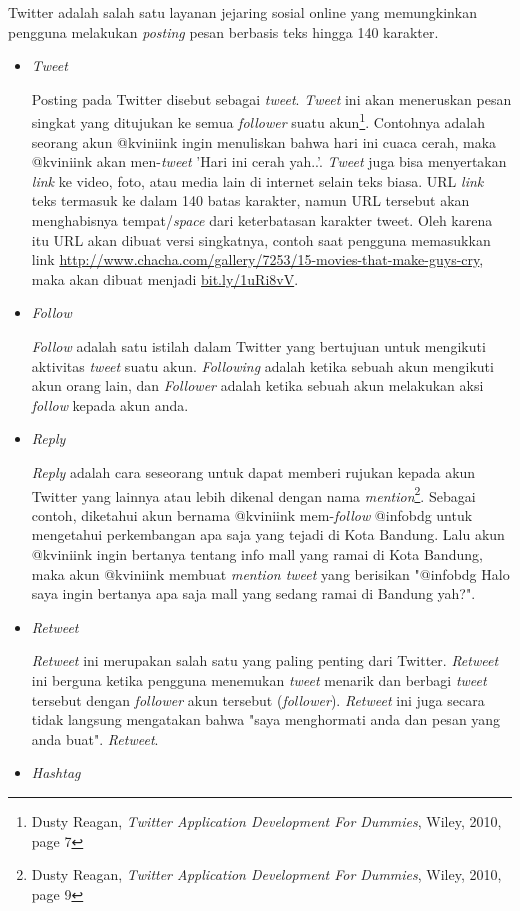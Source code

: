 Twitter adalah salah satu layanan jejaring sosial online yang memungkinkan pengguna melakukan \textit{posting} pesan berbasis teks hingga 140 karakter\cite{TwitterBook}.
\begin{itemize}
	\item \textit{Tweet} 
	
	Posting pada Twitter disebut sebagai \textit{tweet}. \textit{Tweet} ini akan meneruskan pesan singkat yang ditujukan ke semua \textit{follower} suatu akun\footnote{Dusty Reagan, \textit{Twitter Application Development For Dummies}, Wiley, 2010, page 7}. Contohnya adalah seorang akun @kviniink ingin menuliskan bahwa hari ini cuaca cerah, maka @kviniink akan men-\textit{tweet} 'Hari ini cerah yah..'. \textit{Tweet} juga bisa menyertakan \textit{link} ke video, foto, atau media lain di internet selain teks biasa. URL \textit{link} teks termasuk ke dalam 140 batas karakter, namun URL tersebut akan menghabisnya tempat/\textit{space} dari keterbatasan karakter tweet. Oleh karena itu URL akan dibuat versi singkatnya, contoh saat pengguna memasukkan link \url{http://www.chacha.com/gallery/7253/15-movies-that-make-guys-cry}, maka akan dibuat menjadi \url{bit.ly/1uRi8vV}. 
	\item \textit{Follow}
	
	\textit{Follow} adalah satu istilah dalam Twitter yang bertujuan untuk mengikuti aktivitas \textit{tweet} suatu akun. \textit{Following} adalah ketika sebuah akun mengikuti akun orang lain, dan \textit{Follower} adalah ketika sebuah akun melakukan aksi \textit{follow} kepada akun anda.
	\item \textit{Reply} 
	
	\textit{Reply} adalah cara seseorang untuk dapat memberi rujukan kepada akun Twitter yang lainnya atau lebih dikenal dengan nama \textit{mention}\footnote{Dusty Reagan, \textit{Twitter Application Development For Dummies}, Wiley, 2010, page 9}. Sebagai contoh, diketahui akun bernama @kviniink mem-\textit{follow} @infobdg untuk mengetahui perkembangan apa saja yang tejadi di Kota Bandung. Lalu akun @kviniink ingin bertanya tentang info mall yang ramai di Kota Bandung, maka akun @kviniink membuat \textit{mention tweet} yang berisikan "@infobdg Halo saya ingin bertanya apa saja mall yang sedang ramai di Bandung yah?".
	\item \textit{Retweet}
	
	\textit{Retweet} ini merupakan salah satu yang paling penting dari Twitter. \textit{Retweet} ini berguna ketika pengguna menemukan \textit{tweet} menarik dan berbagi \textit{tweet} tersebut dengan \textit{follower} akun tersebut (\textit{follower}). \textit{Retweet} ini juga secara tidak langsung mengatakan bahwa "saya menghormati anda dan pesan yang anda buat". \textit{Retweet}.
	\item \textit{Hashtag}
	

\end{itemize}
